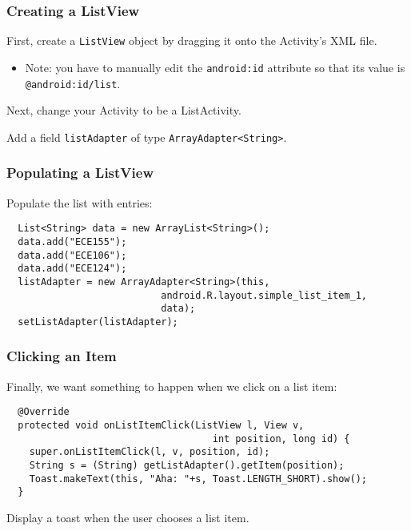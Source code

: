 \begin{frame}[fragile]
\frametitle{Creating a ListView}
\begin{changemargin}{1cm}

First, create a {\tt ListView} object by dragging it onto the Activity's XML file.
\begin{itemize}
\item Note: you have to manually edit the {\tt android:id} attribute so
that its value is \verb+@android:id/list+.
\end{itemize}
Next, change your Activity to be a ListActivity. 

Add a field {\tt listAdapter} of type \verb+ArrayAdapter<String>+.


\end{changemargin}
\end{frame}

\begin{frame}[fragile]
\frametitle{Populating a ListView}
\begin{changemargin}{1cm}

Populate the list with entries:

{\scriptsize
\begin{verbatim}
  List<String> data = new ArrayList<String>();
  data.add("ECE155");
  data.add("ECE106");
  data.add("ECE124");
  listAdapter = new ArrayAdapter<String>(this,
                           android.R.layout.simple_list_item_1,
                           data);
  setListAdapter(listAdapter);
\end{verbatim}
}
\end{changemargin}
\end{frame}


\begin{frame}[fragile]
\frametitle{Clicking an Item}
\begin{changemargin}{1cm}

Finally, we want something to happen when we click on a list item:

{\scriptsize
\begin{verbatim}
  @Override
  protected void onListItemClick(ListView l, View v, 
                                    int position, long id) {
    super.onListItemClick(l, v, position, id);
    String s = (String) getListAdapter().getItem(position);
    Toast.makeText(this, "Aha: "+s, Toast.LENGTH_SHORT).show();
  }
\end{verbatim}
}
Display a toast when the user chooses a list item.


\end{changemargin}
\end{frame}



